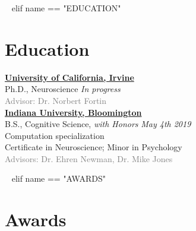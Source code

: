 ~{ elif name == "EDUCATION" }~


\section{Education} 

\href{http://www.uci.edu/}{\textbf{University of California, Irvine}} \\
Ph.D., Neuroscience \hfill \textit{In progress}\\
\textcolor{grey}{Advisor: Dr. Norbert Fortin}\\




\href{http://www.iu.edu/}{\textbf{Indiana University, Bloomington}} \\
B.S., Cognitive Science, \textit{with Honors} \hfill \textit{May 4th 2019} \\
Computation specialization \\
Certificate in Neuroscience; Minor in Psychology\\
\textcolor{grey}{Advisors: Dr. Ehren Newman, Dr. Mike Jones}






~{ elif name == "AWARDS" }~

\section{Awards}

